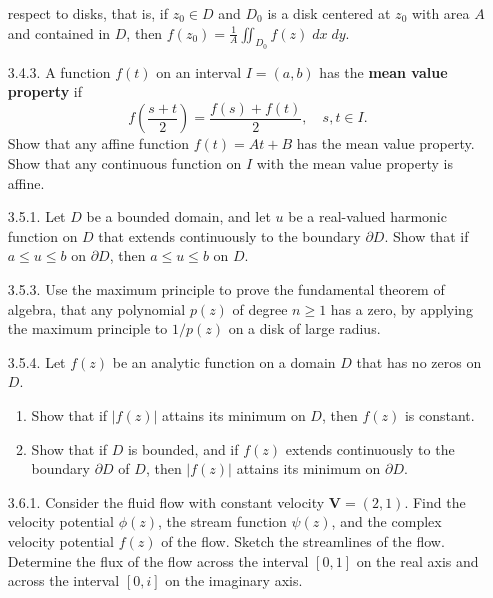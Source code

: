 \documentclass[9pt]{article}
\begin{document}
\begin{enumerate}
                  respect to disks, that is, if $z_0 \in D$ and $D_0$ is a disk
                  centered at $z_0$ with area $A$ and contained in $D$, then
                  $f(z_0) = \frac{1}{A} \iint_{D_0} f(z)\;dx\;dy$.
   \item[3.4.3.]  A function $f(t)$ on an interval $I = (a, b)$ has the
                  \textbf{mean value property} if
                  $$f\left(\frac{s+t}{2}\right) = \frac{f(s) + f(t)}{2},
                    \quad s, t \in I.$$
                  Show that any affine function $f(t) = At + B$ has the mean
                  value property. Show that any continuous function on $I$ with
                  the mean value property is affine.
   \item[3.5.1.]  Let $D$ be a bounded domain, and let $u$ be a real-valued
                  harmonic function on $D$ that extends continuously to the
                  boundary $\partial D$. Show that if $a \le u \le b$ on
                  $\partial D$, then $a \le u \le b$ on $D$.
   \item[3.5.3.]  Use the maximum principle to prove the fundamental theorem of
                  algebra, that any polynomial $p(z)$ of degree $n \ge 1$ has a
                  zero, by applying the maximum principle to $1/p(z)$ on a disk
                  of large radius.
   \item[3.5.4.]  Let $f(z)$ be an analytic function on a domain $D$ that has no
                  zeros on $D$.
                  \begin{enumerate}
                     \item Show that if $|f(z)|$ attains its minimum on $D$,
                           then $f(z)$ is constant.
                     \item Show that if $D$ is bounded, and if $f(z)$ extends
                           continuously to the boundary $\partial D$ of $D$,
                           then $|f(z)|$ attains its minimum on $\partial D$.
                  \end{enumerate}
   \item[3.6.1.]  Consider the fluid flow with constant velocity
                  $\textbf{V} = (2, 1)$. Find the velocity potential $\phi(z)$,
                  the stream function $\psi(z)$, and the complex velocity
                  potential $f(z)$ of the flow. Sketch the streamlines of the
                  flow. Determine the flux of the flow across the interval
                  $[0, 1]$ on the real axis and across the interval $[0, i]$ on
                  the imaginary axis.
\end{enumerate}
\end{document}
